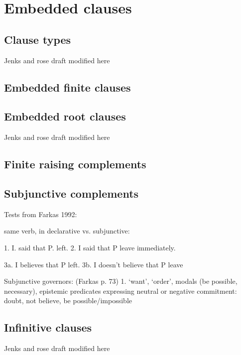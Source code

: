 \chapter{Embedded clauses}\label{chapter:embeddedclauses}


\section{Clause types}\label{sec:ch15:clausetypes}


Jenks and rose draft modified here


\section{Embedded finite clauses}\label{sec:ch15:finiteclauses}

\section{Embedded root clauses}\label{sec:ch15:rtc}

Jenks and rose draft modified here

\section{Finite raising complements}\label{sec:ch15:dpc1}


\section{Subjunctive complements}\label{sec:ch15:dpc2}

Tests from Farkas 1992:

same verb, in declarative vs. subjunctive:

1. I. said that P. left.
2. I said that P leave immediately.

3a. I believes that P left.
3b. I doesn't believe that P leave

Subjunctive governors: (Farkas p. 73)
1. `want', `order', modals (be possible, necessary), epistemic predicates expressing neutral or negative commitment: doubt, not believe, be possible/impossible



\section{Infinitive clauses}\label{sec:ch15:infinitives}


Jenks and rose draft modified here